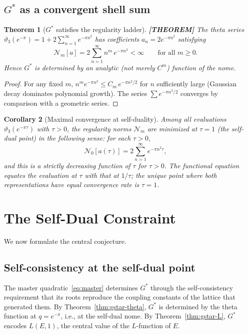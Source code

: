 \documentclass[11pt]{article}
\theoremstyle{tight}
\newtheorem{theorem}{Theorem}[section]
\newtheorem{corollary}[theorem]{Corollary}
\theoremstyle{plainroman}
\newcommand{\Nreg}{\mathcal{N}}
\begin{document}
\subsection{$G^*$ as a convergent shell sum}

\begin{theorem}[$G^*$ satisfies the regularity ladder]\label{thm:gstar-regular}
\textbf{[THEOREM]}
The theta series $\vartheta_3(e^{-\pi})=1+2\sum_{n=1}^\infty e^{-\pi n^2}$ has coefficients $a_n=2e^{-\pi n^2}$ satisfying
\[
\Nreg_m[a]=2\sum_{n=1}^\infty n^m\,e^{-\pi n^2}<\infty \qquad \text{for all }m\ge 0.
\]
Hence $G^*$ is determined by an analytic (not merely $C^m$) function of the nome.
\end{theorem}
\begin{proof}
For any fixed $m$, $n^m e^{-\pi n^2}\le C_m\,e^{-\pi n^2/2}$ for $n$ sufficiently large (Gaussian decay dominates polynomial growth).
The series $\sum e^{-\pi n^2/2}$ converges by comparison with a geometric series.
\end{proof}

\begin{corollary}[Maximal convergence at self-duality]\label{cor:maxconv}
Among all evaluations $\vartheta_3(e^{-\pi\tau})$ with $\tau>0$, the regularity norms $\Nreg_m$ are minimized at $\tau=1$ (the self-dual point) in the following sense: for each $\tau>0$,
\[
\Nreg_0[a(\tau)]=2\sum_{n=1}^\infty e^{-\pi n^2\tau},
\]
and this is a strictly decreasing function of $\tau$ for $\tau>0$.
The functional equation equates the evaluation at $\tau$ with that at $1/\tau$; the unique point where both representations have equal convergence rate is $\tau=1$.
\end{corollary}

\section{The Self-Dual Constraint}

We now formulate the central conjecture.

\subsection{Self-consistency at the self-dual point}

The master quadratic~\eqref{eq:master} determines $G^*$ through the self-consistency requirement that its roots reproduce the coupling constants of the lattice that generated them.
By Theorem~\ref{thm:gstar-theta}, $G^*$ is determined by the theta function at $q=e^{-\pi}$, i.e., at the self-dual nome.
By Theorem~\ref{thm:gstar-L}, $G^*$ encodes $L(E,1)$, the central value of the $L$-function of $E$.
\end{document}
